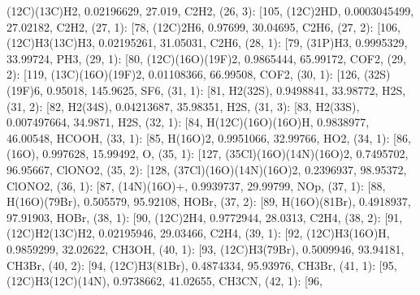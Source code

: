 \documentclass[letterpaper,10pt,english]{sphinxmanual}
\begin{document}
\begin{fulllineitems}
\textquotesingle{}(12C)(13C)H2\textquotesingle{}, 0.02196629, 27.019, \textquotesingle{}C2H2\textquotesingle{}{]}, (26, 3): {[}105, \textquotesingle{}(12C)2HD\textquotesingle{}, 0.0003045499, 27.02182, \textquotesingle{}C2H2\textquotesingle{}{]}, (27, 1): {[}78, \textquotesingle{}(12C)2H6\textquotesingle{}, 0.97699, 30.04695, \textquotesingle{}C2H6\textquotesingle{}{]}, (27, 2): {[}106, \textquotesingle{}(12C)H3(13C)H3\textquotesingle{}, 0.02195261, 31.05031, \textquotesingle{}C2H6\textquotesingle{}{]}, (28, 1): {[}79, \textquotesingle{}(31P)H3\textquotesingle{}, 0.9995329, 33.99724, \textquotesingle{}PH3\textquotesingle{}{]}, (29, 1): {[}80, \textquotesingle{}(12C)(16O)(19F)2\textquotesingle{}, 0.9865444, 65.99172, \textquotesingle{}COF2\textquotesingle{}{]}, (29, 2): {[}119, \textquotesingle{}(13C)(16O)(19F)2\textquotesingle{}, 0.01108366, 66.99508, \textquotesingle{}COF2\textquotesingle{}{]}, (30, 1): {[}126, \textquotesingle{}(32S)(19F)6\textquotesingle{}, 0.95018, 145.9625, \textquotesingle{}SF6\textquotesingle{}{]}, (31, 1): {[}81, \textquotesingle{}H2(32S)\textquotesingle{}, 0.9498841, 33.98772, \textquotesingle{}H2S\textquotesingle{}{]}, (31, 2): {[}82, \textquotesingle{}H2(34S)\textquotesingle{}, 0.04213687, 35.98351, \textquotesingle{}H2S\textquotesingle{}{]}, (31, 3): {[}83, \textquotesingle{}H2(33S)\textquotesingle{}, 0.007497664, 34.9871, \textquotesingle{}H2S\textquotesingle{}{]}, (32, 1): {[}84, \textquotesingle{}H(12C)(16O)(16O)H\textquotesingle{}, 0.9838977, 46.00548, \textquotesingle{}HCOOH\textquotesingle{}{]}, (33, 1): {[}85, \textquotesingle{}H(16O)2\textquotesingle{}, 0.9951066, 32.99766, \textquotesingle{}HO2\textquotesingle{}{]}, (34, 1): {[}86, \textquotesingle{}(16O)\textquotesingle{}, 0.997628, 15.99492, \textquotesingle{}O\textquotesingle{}{]}, (35, 1): {[}127, \textquotesingle{}(35Cl)(16O)(14N)(16O)2\textquotesingle{}, 0.7495702, 96.95667, \textquotesingle{}ClONO2\textquotesingle{}{]}, (35, 2): {[}128, \textquotesingle{}(37Cl)(16O)(14N)(16O)2\textquotesingle{}, 0.2396937, 98.95372, \textquotesingle{}ClONO2\textquotesingle{}{]}, (36, 1): {[}87, \textquotesingle{}(14N)(16O)+\textquotesingle{}, 0.9939737, 29.99799, \textquotesingle{}NOp\textquotesingle{}{]}, (37, 1): {[}88, \textquotesingle{}H(16O)(79Br)\textquotesingle{}, 0.505579, 95.92108, \textquotesingle{}HOBr\textquotesingle{}{]}, (37, 2): {[}89, \textquotesingle{}H(16O)(81Br)\textquotesingle{}, 0.4918937, 97.91903, \textquotesingle{}HOBr\textquotesingle{}{]}, (38, 1): {[}90, \textquotesingle{}(12C)2H4\textquotesingle{}, 0.9772944, 28.0313, \textquotesingle{}C2H4\textquotesingle{}{]}, (38, 2): {[}91, \textquotesingle{}(12C)H2(13C)H2\textquotesingle{}, 0.02195946, 29.03466, \textquotesingle{}C2H4\textquotesingle{}{]}, (39, 1): {[}92, \textquotesingle{}(12C)H3(16O)H\textquotesingle{}, 0.9859299, 32.02622, \textquotesingle{}CH3OH\textquotesingle{}{]}, (40, 1): {[}93, \textquotesingle{}(12C)H3(79Br)\textquotesingle{}, 0.5009946, 93.94181, \textquotesingle{}CH3Br\textquotesingle{}{]}, (40, 2): {[}94, \textquotesingle{}(12C)H3(81Br)\textquotesingle{}, 0.4874334, 95.93976, \textquotesingle{}CH3Br\textquotesingle{}{]}, (41, 1): {[}95, \textquotesingle{}(12C)H3(12C)(14N)\textquotesingle{}, 0.9738662, 41.02655, \textquotesingle{}CH3CN\textquotesingle{}{]}, (42, 1): {[}96, 
\end{fulllineitems}
\end{document}
